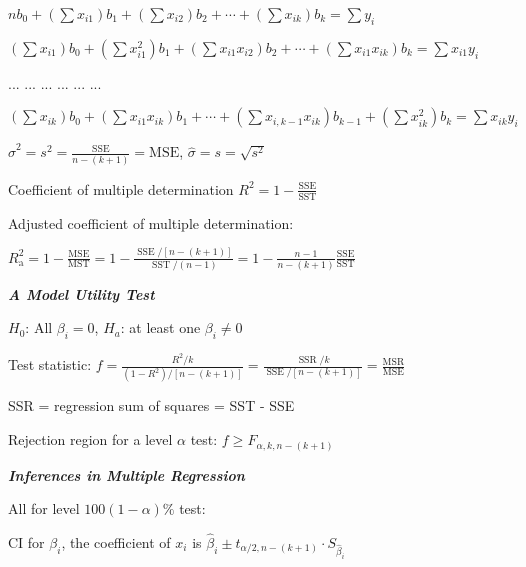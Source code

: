 \documentclass{article}
\newcommand{\smalltitle}[1]{
	\noindent
	\textbf{\textit{#1}}
}
\begin{document}
	{\small 
		\noindent
		$n b _ { 0 } + \left( \sum x _ { i 1 } \right) b _ { 1 } + \left( \sum x _ { i 2 } \right) b _ { 2 } + \cdots + \left( \sum x _ { i k } \right) b _ { k } = \sum y _ { i }$
		
		\noindent
		$\left( \sum x _ { i 1 } \right) b _ { 0 } + \left( \sum x _ { i 1 } ^ { 2 } \right) b _ { 1 } + \left( \sum x _ { i 1 } x _ { i 2 } \right) b _ { 2 } + \cdots + \left( \sum x _ { i 1 } x _ { i k } \right) b _ { k } = \sum x _ { i 1 } y _ { i }$
		
		... ... ... ... ... ...
		
		{\footnotesize \noindent
			$\left( \sum x _ { i k } \right) b _ { 0 } + \left( \sum x _ { i 1 } x _ { i k } \right) b _ { 1 } + \cdots + \left( \sum x _ { i , k - 1 } x _ { i k } \right) b _ { k - 1 } + \left( \sum x _ { i k } ^ { 2 } \right) b _ { k } = \sum x _ { i k } y _ { i }$}
		
	}
	
	$\hat { \sigma } ^ { 2 } = s ^ { 2 } = \frac { \mathrm { SSE } } { n - ( k + 1 ) } = \mathrm { MSE }$, $\hat { \sigma } = s = \sqrt { s ^ { 2 } }$
	
	Coefficient of multiple determination $R ^ { 2 } = 1 - \frac { \mathrm { SSE } } { \mathrm { SST } }$
	
	Adjusted coefficient of multiple determination:
	
	$R _ { \mathrm { a } } ^ { 2 } = 1 - \frac { \mathrm { MSE } } { \mathrm { MST } } = 1 - \frac { \operatorname { SSE } / [ n - ( k + 1 ) ] } { \operatorname { SST } / ( n - 1 ) } = 1 - \frac { n - 1 } { n - ( k + 1 ) } \frac { \mathrm { SSE } } { \mathrm { SST } }$
	
	\smalltitle{A Model Utility Test}
	
	$H_0$: All $\beta_i = 0$,
	$H_a$: at least one $\beta_i \neq 0$
	
	Test statistic: $f = \frac { R ^ { 2 } / k } { \left( 1 - R ^ { 2 } \right) / [ n - ( k + 1 ) ] } = \frac { \operatorname { SSR } / k } { \operatorname { SSE } / [ n - ( k + 1 ) ] } = \frac { \mathrm { MSR } } { \mathrm { MSE } }$
	
	SSR = regression sum of squares = SST - SSE
	
	Rejection region for a level $\alpha$ test: $f \geq F _ { \alpha , k , n - ( k + 1 ) }$
	
	\smalltitle{Inferences in Multiple Regression}
	
	All for level $100(1-\alpha)\%$ test:
	
	CI for $\beta_i$, the coefficient of $x_i$ is $\hat { \beta } _ { i } \pm t _ { \alpha / 2 , n - ( k + 1 ) } \cdot S _ { \hat { \beta } _ { i } }$
	
\end{document}
